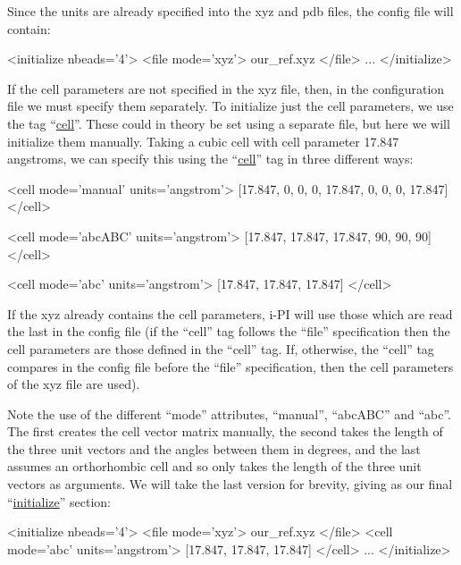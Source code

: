 \documentclass[11pt,english,fleqn]{report}
\newenvironment{code}{%
\footnotesize 
\verbatim
}{
\endverbatim
\normalsize
}
\begin{document}
Since the units are already specified into the xyz and pdb files, the
config file will contain:

\begin{code}
<initialize nbeads='4'>
   <file mode='xyz'> our_ref.xyz </file>
   ...
</initialize>
\end{code}

If the cell parameters are not specified in the xyz file, then, in the 
configuration file we must specify them separately. 
To initialize just the cell parameters, 
we use the tag {}``\hyperref[INITCELL]{cell}''.
These could in theory be set using a separate
file, but here we will initialize them manually. Taking a cubic cell
with cell parameter 17.847 angstroms, we can specify this using
the {}``\hyperref[INITCELL]{cell}'' tag in three different ways:

\begin{code}
<cell mode='manual' units='angstrom'> 
   [17.847, 0, 0, 0, 17.847, 0, 0, 0, 17.847] 
</cell>
\end{code}

\begin{code}
<cell mode='abcABC' units='angstrom'>
   [17.847, 17.847, 17.847, 90, 90, 90]
</cell>
\end{code}

\begin{code}
<cell mode='abc' units='angstrom'>
   [17.847, 17.847, 17.847]
</cell>
\end{code}

If the xyz already contains the cell parameters, i-PI will use those
which are read the last in the config file (if the {}``cell'' tag
follows the {}``file'' specification then the cell parameters are those
defined in the {}``cell'' tag. If, otherwise, the {}``cell'' tag
compares in the config file before the {}``file'' specification, then
the cell parameters of the xyz file are used).

Note the use of the different {}``mode'' attributes, {}``manual'',
{}``abcABC'' and {}``abc''. The first creates the cell vector
matrix manually, the second takes the length of the three unit vectors
and the angles between them in degrees, and the last assumes an orthorhombic
cell and so only takes the length of the three unit vectors as arguments.
We will take the last version for brevity, giving as our final 
{}``\hyperref[INITIALIZER]{initialize}'' section:

\begin{code}
<initialize nbeads='4'>
   <file mode='xyz'> our_ref.xyz </file>
   <cell mode='abc' units='angstrom'>
      [17.847, 17.847, 17.847]
   </cell>
   ...
</initialize>
\end{code}
\end{document}
